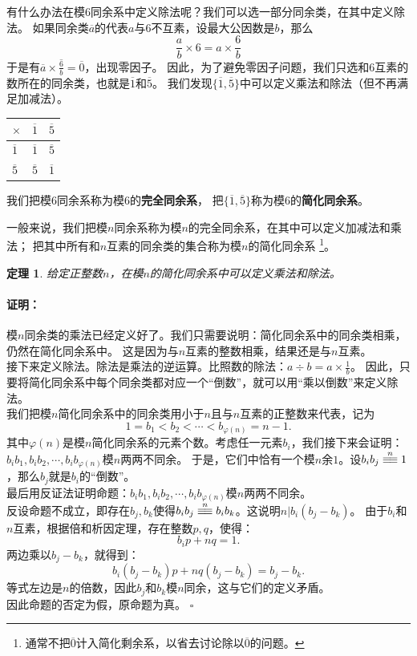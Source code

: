 \documentclass[12pt,UTF8]{ctexbook}
\newtheorem{tm}{定理}[section]
\renewenvironment{proof}{\paragraph{\textbf{证明：}}}{\hfill$\square$}
\newcommand{\tong}[1]{\overset{#1}{\equiv\joinrel\equiv}}
\begin{document}
有什么办法在模$6$同余系中定义除法呢？我们可以选一部分同余类，在其中定义除法。
如果同余类$\overline{a}$的代表$a$与$6$不互素，设最大公因数是$b$，那么
$$ \frac{a}{b} \times 6 = a \times \frac{6}{b} $$
于是有$\overline{a} \times \overline{\frac{6}{b}} = \overline{0}$，出现零因子。
因此，为了避免零因子问题，我们只选和$6$互素的数所在的同余类，也就是$\overline{1}$和$\overline{5}$。
我们发现$\{\overline{1}, \overline{5}\}$中可以定义乘法和除法（但不再满足加减法）。
\begin{center}
    \begin{tabular}{ | p{2em}<{\centering} | p{2em}<{\centering} | p{2em}<{\centering} | }
        \hline
            $\times$   & $\overline{1}$ & $\overline{5}$ \\ [0.5ex] 
        \hline
        $\overline{1}$ & $\overline{1}$ & $\overline{5}$ \\
        \hline
        $\overline{5}$ & $\overline{5}$ & $\overline{1}$ \\
        \hline
    \end{tabular}
\end{center}
我们把模$6$同余系称为模$6$的\textbf{完全同余系}，
把$\{\overline{1}, \overline{5}\}$称为模$6$的\textbf{简化同余系}。

一般来说，我们把模$n$同余系称为模$n$的完全同余系，在其中可以定义加减法和乘法；
把其中所有和$n$互素的同余类的集合称为模$n$的简化同余系
\footnote{通常不把$\overline{0}$计入简化剩余系，以省去讨论除以$\overline{0}$的问题。}。

\begin{tm}\label{tm:3-2-0}
    给定正整数$n$，在模$n$的简化同余系中可以定义乘法和除法。
\end{tm}
\begin{proof}
    模$n$同余类的乘法已经定义好了。我们只需要说明：简化同余系中的同余类相乘，仍然在简化同余系中。
    这是因为与$n$互素的整数相乘，结果还是与$n$互素。\\
    接下来定义除法。除法是乘法的逆运算。比照数的除法：$a \div b = a \times \frac{1}{b}$。
    因此，只要将简化同余系中每个同余类都对应一个“倒数”，就可以用“乘以倒数”来定义除法。\\
    我们把模$n$简化同余系中的同余类用小于$n$且与$n$互素的正整数来代表，记为
    $$1 = b_1 < b_2 < \cdots < b_{\varphi(n)} = n-1.$$
    其中$\varphi(n)$是模$n$简化同余系的元素个数。考虑任一元素$b_i$，我们接下来会证明：
    $b_ib_1, b_ib_2, \cdots, b_ib_{\varphi(n)}$模$n$两两不同余。
    于是，它们中恰有一个模$n$余$1$。设$b_ib_j \tong{n} 1$，那么$b_j$就是$b_i$的“倒数”。\\
    最后用反证法证明命题：$b_ib_1, b_ib_2, \cdots, b_ib_{\varphi(n)}$模$n$两两不同余。\\
    反设命题不成立，即存在$b_j, b_k$使得$b_ib_j \tong{n} b_ib_k$。这说明$n | b_i(b_j - b_k)$。
    由于$b_i$和$n$互素，根据倍和析因定理，存在整数$p, q$，使得：
    $$ b_ip + nq = 1.$$
    两边乘以$b_j - b_k$，就得到：
    $$ b_i(b_j - b_k)p + nq(b_j - b_k) = b_j - b_k.$$
    等式左边是$n$的倍数，因此$b_j$和$b_k$模$n$同余，这与它们的定义矛盾。\\
    因此命题的否定为假，原命题为真。
\end{proof}
\end{document}
